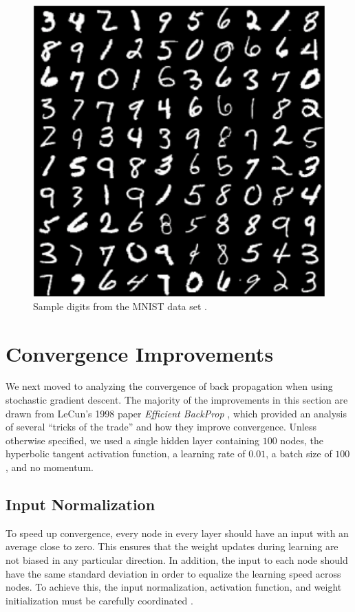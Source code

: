 \documentclass[journal,hidelinks]{IEEEtran}
\begin{document}
\begin{figure}[!htb]
  \centering
  \includegraphics[width=0.8\columnwidth]{figures/mnist.png}
  \caption{Sample digits from the MNIST data set \cite{steeves_2015}.}
  \label{fig:mnist}
\end{figure}

\section{Convergence Improvements}

We next moved to analyzing the convergence of back propagation when using stochastic gradient descent. The majority of the improvements in this section are drawn from LeCun's 1998 paper \textit{Efficient BackProp} \cite{lecun_efficient_1998}, which provided an analysis of several ``tricks of the trade'' and how they improve convergence. Unless otherwise specified, we used a single hidden layer containing $100$ nodes, the hyperbolic tangent activation function, a learning rate of $0.01$, a batch size of $100$, and no momentum.

\subsection{Input Normalization}

To speed up convergence, every node in every layer should have an input with an average close to zero. This ensures that the weight updates during learning are not biased in any particular direction. In addition, the input to each node should have the same standard deviation in order to equalize the learning speed across nodes. To achieve this, the input normalization, activation function, and weight initialization must be carefully coordinated \cite{lecun_efficient_1998}.
\end{document}
